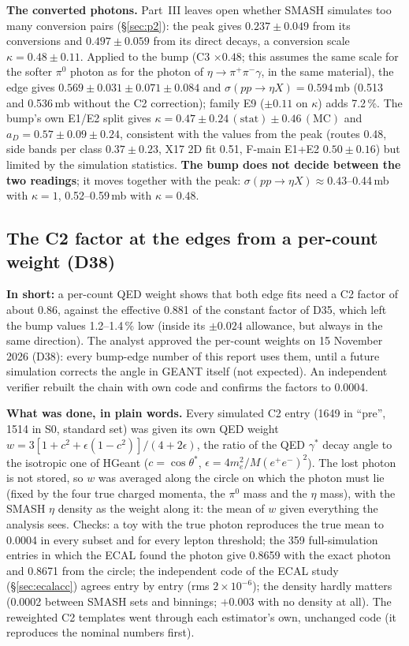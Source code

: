 \documentclass[11pt,a4paper]{article}
\newcommand{\piz}{\ensuremath{\pi^{0}}\xspace}
\newcommand{\pipi}{\ensuremath{\pi^{+}\pi^{-}}\xspace}
\newcommand{\Mee}{\ensuremath{M(e^{+}e^{-})}\xspace}
\newcommand{\sigeta}{\ensuremath{\sigma(pp\to\eta X)}\xspace}
\newcommand{\tipbox}[1]{\par\noindent\colorbox{blue!6}{\parbox{\dimexpr\linewidth-2\fboxsep\relax}{#1}}\par}
\newcommand{\inshort}[1]{\tipbox{\textbf{In short:} #1}}%
\begin{document}
\textbf{The converted photons.} Part~III leaves open whether SMASH simulates too many conversion pairs (\S\ref{sec:p2}): the peak gives $0.237\pm0.049$
from its conversions and $0.497\pm0.059$ from its direct decays, a conversion scale $\kappa=0.48\pm0.11$. Applied to the bump (C3 $\times0.48$; this
assumes the same scale for the softer \piz photon as for the photon of $\eta\to\pipi\gamma$, in the same material), the edge gives
$0.569\pm0.031\pm0.071\pm0.084$ and $\sigeta=0.594$\,mb (0.513 and 0.536\,mb without the C2 correction); family E9 ($\pm0.11$ on $\kappa$) adds 7.2\,\%.
The bump's own E1/E2 split gives $\kappa=0.47\pm0.24\,(\mathrm{stat})\pm0.46\,(\mathrm{MC})$ and $a_D=0.57\pm0.09\pm0.24$, consistent with the
values from the peak (routes 0.48, side bands per class $0.37\pm0.23$, X17 2D fit 0.51, F-main E1+E2 $0.50\pm0.16$) but limited by the simulation
statistics. \textbf{The bump does not decide between the two readings}; it moves together with the peak: $\sigeta\approx0.43$--0.44\,mb with
$\kappa=1$, 0.52--0.59\,mb with $\kappa=0.48$.

\subsection{The C2 factor at the edges from a per-count weight (D38)}
\label{sec:c2recon}
\inshort{a per-count QED weight shows that both edge fits need a C2 factor of about 0.86, against the effective 0.881 of the constant factor of
D35, which left the bump values 1.2--1.4\,\% low (inside its $\pm0.024$ allowance, but always in the same direction). The analyst approved the
per-count weights on 15 November 2026 (D38): every bump-edge number of this report uses them, until a future simulation corrects the angle in
GEANT itself (not expected). An independent verifier rebuilt the chain with own code and confirms the factors to 0.0004.}

\textbf{What was done, in plain words.} Every simulated C2 entry (1649 in ``pre'', 1514 in S0, standard set) was given its own QED weight
$w=3[1+c^2+\epsilon(1-c^2)]/(4+2\epsilon)$, the ratio of the QED $\gamma^*$ decay angle to the isotropic one of HGeant ($c=\cos\theta^*$,
$\epsilon=4m_e^2/\Mee^2$). The lost photon is not stored, so $w$ was averaged along the circle on which the photon must lie (fixed by the four true
charged momenta, the \piz mass and the $\eta$ mass), with the SMASH $\eta$ density as the weight along it: the mean of $w$ given everything the
analysis sees. Checks: a toy with the true photon reproduces the true mean to 0.0004 in every subset and for every lepton threshold; the 359
full-simulation entries in which the ECAL found the photon give 0.8659 with the exact photon and 0.8671 from the circle; the independent code of the
ECAL study (\S\ref{sec:ecalacc}) agrees entry by entry (rms $2\times10^{-6}$); the density hardly matters (0.0002 between SMASH sets and binnings;
$+0.003$ with no density at all). The reweighted C2 templates went through each estimator's own, unchanged code (it reproduces the nominal
numbers first).
\end{document}
